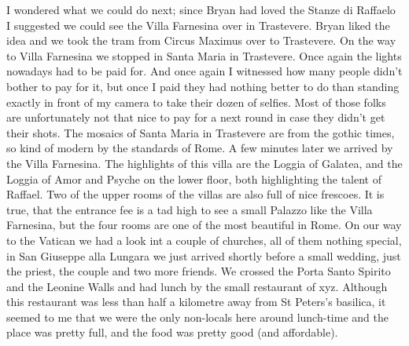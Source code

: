 I wondered what we could do next; since Bryan had loved the Stanze di Raffaelo I suggested we could see the Villa Farnesina over in Trastevere. Bryan liked the idea and we took the tram from Circus Maximus over to Trastevere. On the way to Villa Farnesina we stopped in Santa Maria in Trastevere. Once again the lights nowadays had to be paid for. And once again I witnessed how many people didn't bother to pay for it, but once I paid they had nothing better to do than standing exactly in front of my camera to take their dozen of selfies. Most of those folks are unfortunately not that nice to pay for a next round in case they didn't get their shots. The mosaics of Santa Maria in Trastevere are from the gothic times, so kind of modern by the standards of Rome. A few minutes later we arrived by the Villa Farnesina. The highlights of this villa are the Loggia of Galatea, and the Loggia of Amor and Psyche on the lower floor, both highlighting the talent of Raffael. Two of the upper rooms of the villas are also full of nice frescoes. It is true, that the entrance fee is a tad high to see a small Palazzo like the Villa Farnesina, but the four rooms are one of the most beautiful in Rome. On our way to the Vatican we had a look int a couple of churches, all of them nothing special, in San Giuseppe alla Lungara we just arrived shortly before a small wedding, just the priest, the couple and two more friends. We crossed the Porta Santo Spirito and the Leonine Walls and had lunch by the small restaurant of xyz. Although this restaurant was less than half a kilometre away from St Peters's basilica, it seemed to me that we were the only non-locals here around lunch-time and the place was pretty full, and the food was pretty good (and affordable).\\
